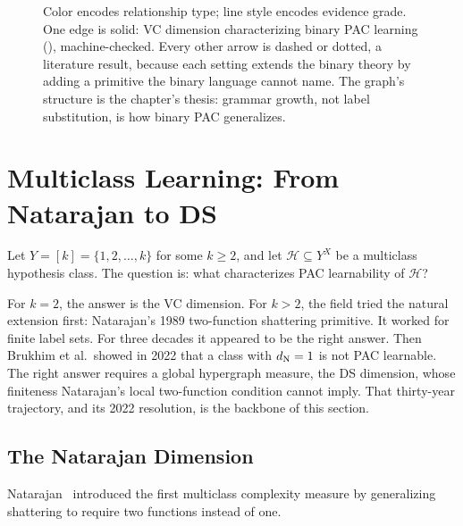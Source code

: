 \begin{figure}[ht]
\begin{tikzpicture}
\end{tikzpicture}

\caption[Concept map: binary PAC generalizes by grammar growth]{Color encodes
relationship type; line style encodes evidence grade.  One edge is solid: VC
dimension characterizing binary PAC
learning (), machine-checked.  Every other arrow
is dashed or dotted, a literature result, because each setting extends the
binary theory by adding a primitive the binary language cannot name.  The
graph's structure is the chapter's thesis: grammar growth, not label
substitution, is how binary PAC generalizes.}
\label{fig:ch17-concept-map}
\end{figure}



\section{Multiclass Learning: From Natarajan to DS}
\label{sec:multiclass-ext}

Let $Y = [k] = \{1, 2, \ldots, k\}$ for some $k \geq 2$, and let
$\mathcal{H} \subseteq Y^X$ be a multiclass hypothesis class.  The question
is: what characterizes PAC learnability of $\mathcal{H}$?

For $k = 2$, the answer is the VC dimension.  For $k > 2$, the field tried
the natural extension first: Natarajan's 1989 two-function shattering
primitive.  It worked for finite label sets.  For three decades it appeared
to be the right answer.  Then Brukhim et al.\ showed in 2022 that a class
with $d_{\mathrm{N}} = 1$ is not PAC learnable.  The right answer requires a global
hypergraph measure, the DS dimension, whose finiteness Natarajan's local
two-function condition cannot imply.  That thirty-year trajectory, and its
2022 resolution, is the backbone of this section.


\subsection{The Natarajan Dimension}

Natarajan~\cite{Natarajan1989} introduced the first multiclass complexity
measure by generalizing shattering to require two functions instead of one.

